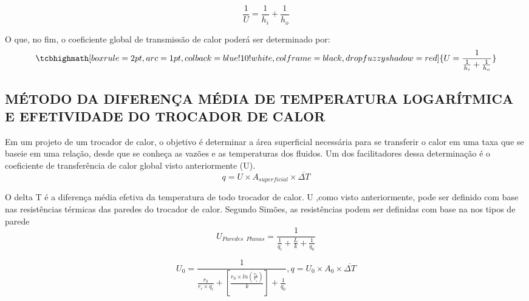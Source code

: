 \documentclass[a4paper,12pt,oneside]{article}
\begin{document}
\begin{flushright}
\begin{equation}\label{eq8}
\frac{1}{U} = \frac{1}{h_i} + \frac{1}{h_o}
\end{equation}
\vspace{0.5cm}

O que, no fim, o coeficiente global de transmissão de calor poderá ser determinado por:\\

\begin{equation}\label{eq9}
 	\tcbhighmath[boxrule=2pt,arc=1pt,colback=blue!10!white,colframe=black,
 drop fuzzy shadow=red]{U = \frac{1}{\frac{1}{h_i} + \frac{1}{h_o}}}
\end{equation}
\vspace{0.5cm}

\pagebreak
\clearpage
\newpage

\subsection{\large MÉTODO DA DIFERENÇA MÉDIA DE TEMPERATURA LOGARÍTMICA E EFETIVIDADE DO TROCADOR DE CALOR}
\vspace{0.5cm}
 
Em um projeto de um trocador de calor, o objetivo é determinar a área superficial necessária para se transferir o calor em uma taxa que se baseie em uma relação, desde que se conheça as vazões e as temperaturas dos fluidos. Um dos facilitadores dessa determinação é o coeficiente de transferência de calor global visto anteriormente (U).\\

\begin{equation}\label{eq10}
	q = U \times A_{superficial} \times \overline{\Delta T}
\end{equation}
\vspace{0.5cm}

O delta T é a diferença média efetiva da temperatura de todo trocador de calor. U ,como visto anteriormente, pode ser definido com base nas resistências térmicas das paredes do trocador de calor. Segundo Simões, as resistências podem ser definidas com base na nos tipos de parede\\

\begin{equation}\label{eq11}
	U_{Paredes\,\,\,Planas} = \frac{1}{\frac{1}{q_{i}} + \frac{L}{k} + \frac{1}{q_{0}}}
\end{equation}
\vspace{0.5cm}

\begin{equation}\label{eq12}
	U_{0} = \frac{1}{{\frac{r_{0}}{r_{i} \times q_{i}}} + \left[ \frac{r_{0} \times ln(\frac{r_{0}}{r_{i}})}{k}\right] + \frac{1}{q_{0}} } , q = U_{0} \times A_{0} \times \overline{\Delta T} 
\end{equation}
\vspace{0.5cm}


\end{flushright}
\end{document}
